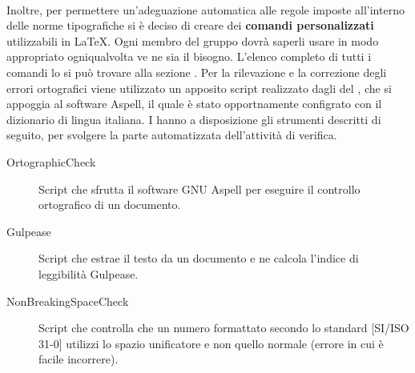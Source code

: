 		\\
		Inoltre, per permettere un’adeguazione automatica alle regole imposte all’interno delle norme tipografiche si è deciso di creare dei \textbf{comandi personalizzati} utilizzabili in \LaTeX{}. Ogni membro del gruppo dovrà saperli usare in modo appropriato ogniqualvolta ve ne sia il bisogno. L’elenco completo di tutti i comandi lo si può trovare alla sezione .
		Per la rilevazione e la correzione degli errori ortografici viene utilizzato un apposito script realizzato dagli  del \groupname{}, che si appoggia al software Aspell, il quale è stato opportnamente configrato con il dizionario di lingua italiana.
		I  hanno a disposizione gli strumenti descritti di seguito, per svolgere la parte automatizzata dell'attività di verifica.
		\begin{description}
			\item[OrtographicCheck] Script che sfrutta il software GNU Aspell per eseguire il controllo ortografico di un documento.
			\item[Gulpease] Script che estrae il testo da un documento e ne calcola l'indice di leggibilità Gulpease.
			\item[NonBreakingSpaceCheck] Script che controlla che un numero formattato secondo lo standard [SI/ISO 31-0] utilizzi lo spazio unificatore e non quello normale (errore in cui è facile incorrere).
		\end{description}
